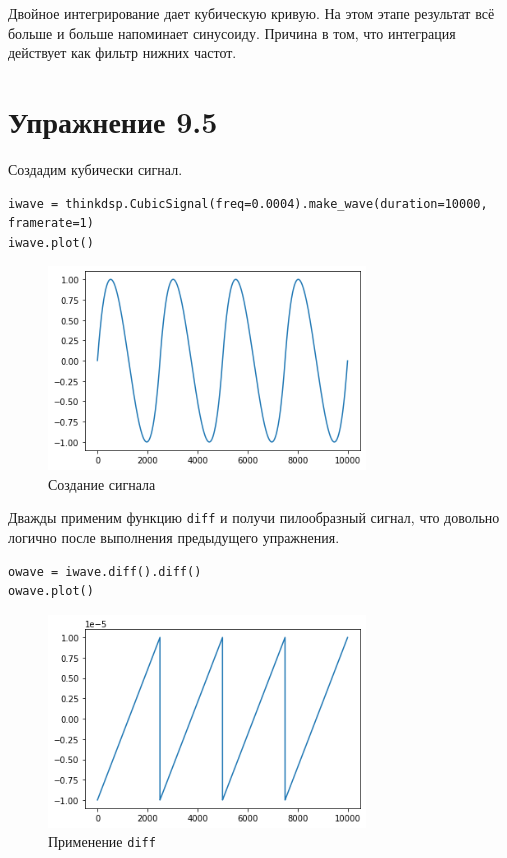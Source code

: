 \documentclass[a4paper,12pt]{report}
\begin{document}
Двойное интегрирование дает кубическую кривую. На этом этапе результат всё больше и больше напоминает синусоиду. Причина в том, что интеграция действует как фильтр нижних частот. 

\chapter{Упражнение 9.5}

Создадим кубически   сигнал.

\begin{lstlisting}[caption=Создание сигнала]
iwave = thinkdsp.CubicSignal(freq=0.0004).make_wave(duration=10000, framerate=1)
iwave.plot()
\end{lstlisting}

\begin{figure}[H]
        \centering
        \includegraphics[width=0.75\textwidth]{10.png}
        \caption{Создание сигнала}
        \label{10}
\end{figure}

Дважды применим функцию \texttt{diff} и получи пилообразный сигнал, что довольно логично после выполнения предыдущего упражнения.

\begin{lstlisting}[caption= Применение \texttt{diff}]
owave = iwave.diff().diff()
owave.plot()
\end{lstlisting}

\begin{figure}[H]
        \centering
        \includegraphics[width=0.75\textwidth]{11.png}
        \caption{Применение \texttt{diff}}
        \label{11}
\end{figure}
\end{document}
